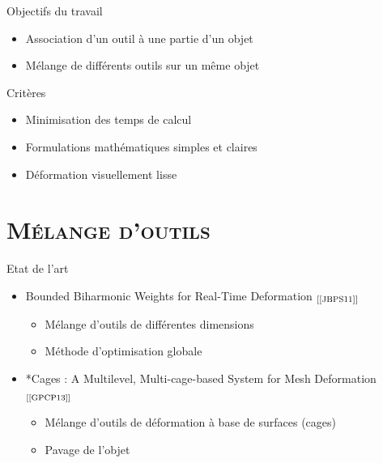 \documentclass[xcolor=x11names,compress]{beamer}
\renewcommand{\(}{\begin{columns}} \renewcommand{\)}{\end{columns}}
\newcommand{\<}[1]{\begin{column}{#1}} \renewcommand{\>}{\end{column}}
\begin{document}
\begin{frame}{Objectifs du travail}
\begin{itemize}
\item Association d'un outil à une partie d'un objet
\item Mélange de différents outils sur un même objet
\end{itemize}
\begin{block}{Critères}
  \begin{itemize}
    \item Minimisation des temps de calcul
    \item Formulations mathématiques simples et claires
    \item Déformation visuellement lisse
  \end{itemize}
\end{block}
\end{frame}


\section{\scshape Mélange d'outils}

\begin{frame}{Etat de l'art}
\begin{itemize}
  \item Bounded Biharmonic Weights for Real-Time Deformation
  $_{[\text{\cite{JBPS11}}]}$
  \begin{itemize}
    \item Mélange d'outils de différentes dimensions
    \item Méthode d'optimisation globale
  \end{itemize}
  \item *Cages : A Multilevel, Multi-cage-based System for Mesh Deformation 
  $_{[\text{\cite{GPCP13}}]}$
  \begin{itemize}
    \item Mélange d'outils de déformation à base de surfaces (cages)
    \item Pavage de l'objet
  \end{itemize}
\end{itemize}
\end{frame}
\end{document}
